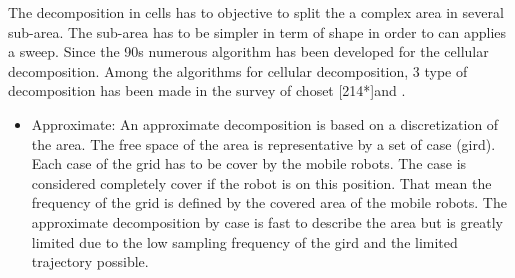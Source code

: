  The decomposition in cells has to objective to split the a complex area in several sub-area. The sub-area has to be simpler in term of shape in order to can applies a sweep. 
Since the 90s numerous algorithm has been developed for the cellular decomposition. Among the algorithms for cellular decomposition, 3 type of decomposition has been made in the survey of choset [214*]and \cite{66*galceran2013}. 
\begin{itemize}
	\item Approximate: 
		An approximate decomposition is based on a discretization of the area. The free space of the area is representative by a set of case (gird). Each case of the grid has to be cover by the mobile robots.  The case is considered  completely cover if the robot is on this position. That mean the frequency of the grid is defined by the covered area of the mobile robots. 
		The approximate decomposition by case is fast to describe the area but is greatly limited due to the low sampling frequency of the gird and the limited trajectory possible.\\
	 

\end{itemize}

